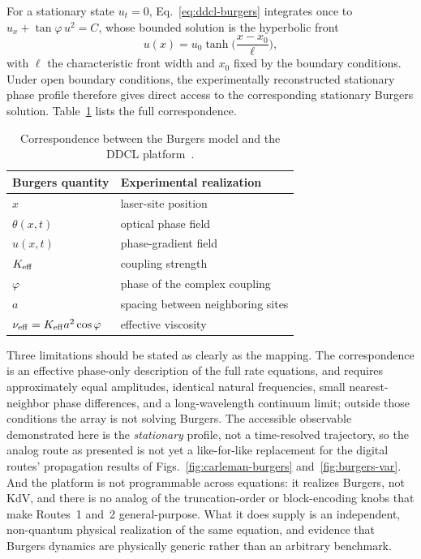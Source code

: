 \documentclass[aps,prx,twocolumn,notitlepage,superscriptaddress,floatfix,10pt]{revtex4-2}
\begin{document}
For a stationary state $u_t=0$, Eq.~\eqref{eq:ddcl-burgers} integrates once to
$u_x+\tan\varphi\,u^2=C$, whose bounded solution is the hyperbolic front
\begin{equation}
u(x)=u_0\tanh\!\Big(\frac{x-x_0}{\ell}\Big),
\end{equation}
with $\ell$ the characteristic front width and $x_0$ fixed by the boundary conditions. Under open
boundary conditions, the experimentally reconstructed stationary phase profile therefore gives direct
access to the corresponding stationary Burgers solution. Table~\ref{tab:ddcl} lists the full
correspondence.

\begin{table}[t]
\caption{Correspondence between the Burgers model and the DDCL platform~\cite{DDCL2026}.}
\label{tab:ddcl}
\begin{ruledtabular}
\begin{tabular}{ll}
Burgers quantity & Experimental realization \\
\hline
$x$ & laser-site position \\
$\theta(x,t)$ & optical phase field \\
$u(x,t)$ & phase-gradient field \\
$K_{\rm eff}$ & coupling strength \\
$\varphi$ & phase of the complex coupling \\
$a$ & spacing between neighboring sites \\
$\nu_{\rm eff}=K_{\rm eff}a^2\cos\varphi$ & effective viscosity \\
\end{tabular}
\end{ruledtabular}
\end{table}

Three limitations should be stated as clearly as the mapping. The correspondence is an effective
phase-only description of the full rate equations, and requires approximately equal amplitudes,
identical natural frequencies, small nearest-neighbor phase differences, and a long-wavelength
continuum limit; outside those conditions the array is not solving Burgers. The accessible observable
demonstrated here is the \emph{stationary} profile, not a time-resolved trajectory, so the analog
route as presented is not yet a like-for-like replacement for the digital routes' propagation results
of Figs.~\ref{fig:carleman-burgers} and~\ref{fig:burgers-var}. And the platform is not programmable
across equations: it realizes Burgers, not KdV, and there is no analog of the truncation-order or
block-encoding knobs that make Routes~1 and~2 general-purpose. What it does supply is an independent,
non-quantum physical realization of the same equation, and evidence that Burgers dynamics are
physically generic rather than an arbitrary benchmark.
\end{document}
